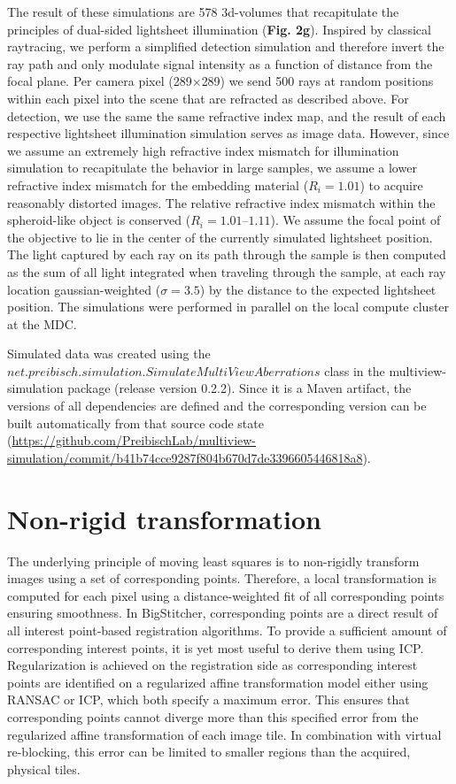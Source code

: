 The result of these simulations are 578 3d-volumes that recapitulate the principles of dual-sided lightsheet illumination (\textbf{Fig. 2g}). Inspired by classical raytracing, we perform a simplified detection simulation and therefore invert the ray path and only modulate signal intensity as a function of distance from the focal plane. Per camera pixel (289$\times$289) we send 500 rays at random positions within each pixel into the scene that are refracted as described above. For detection, we use the same the same refractive index map, and the result of each respective lightsheet illumination simulation serves as image data. However, since we assume an extremely high refractive index mismatch for illumination simulation to recapitulate the behavior in large samples, we assume a lower refractive index mismatch for the embedding material ($R_i=1.01$) to acquire reasonably distorted images. The relative refractive index mismatch within the spheroid-like object is conserved ($R_i=1.01 – 1.11$). We assume the focal point of the objective to lie in the center of the currently simulated lightsheet position. The light captured by each ray on its path through the sample is then computed as the sum of all light integrated when traveling through the sample, at each ray location  gaussian-weighted ($\sigma=3.5$) by the distance to the expected lightsheet position. The simulations were performed in parallel on the local compute cluster at the MDC.

Simulated data was created using the $net.preibisch.simulation.SimulateMultiViewAberrations$ class in the multiview-simulation package (release version 0.2.2). Since it is a Maven artifact, the versions of all dependencies are defined and the corresponding version can be built automatically from that source code state \small(\url{https://github.com/PreibischLab/multiview-simulation/commit/b41b74cce9287f804b670d7de3396605446818a8}).


\section{Non-rigid transformation}
\label{sec:nonrigid}

The underlying principle of moving least squares\cite{movingleastsquares} is to non-rigidly transform images using a set of corresponding points. Therefore, a local transformation is computed for each pixel using a distance-weighted fit of all corresponding points ensuring smoothness. In BigStitcher, corresponding points are a direct result of all interest point-based registration algorithms. To provide a sufficient amount of corresponding interest points, it is yet most useful to derive them using ICP\cite{icp}. Regularization is achieved on the registration side as corresponding interest points are identified on a regularized affine transformation model either using RANSAC\cite{ransac} or ICP\cite{icp}, which both specify a maximum error. This ensures that corresponding points cannot diverge more than this specified error from the regularized affine transformation of each image tile. In combination with virtual re-blocking, this error can be limited to smaller regions than the acquired, physical tiles. 

